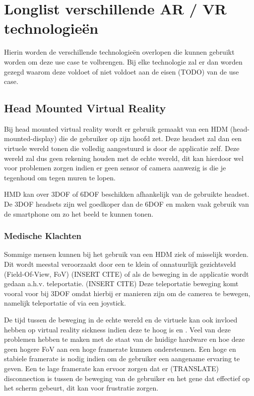 \chapter{Longlist verschillende AR / VR technologieën}
\label{ch:longlist}

Hierin worden de verschillende technologieën overlopen die kunnen gebruikt worden om deze use case te volbrengen.
Bij elke technologie zal er dan worden gezegd waarom deze voldoet of niet voldoet aan de eisen (TODO) van de use case.

\section{Head Mounted Virtual Reality}
Bij head mounted virtual reality wordt er gebruik gemaakt van een HDM (head-mounted-display) die de gebruiker op zijn hoofd zet. Deze headset zal dan een virtuele wereld tonen die volledig aangestuurd is door de applicatie zelf. Deze wereld zal dus geen rekening houden met de echte wereld, dit kan hierdoor wel voor problemen zorgen indien er geen sensor of camera aanwezig is die je tegenhoud om tegen muren te lopen.

HMD kan over 3DOF of 6DOF beschikken afhankelijk van de gebruikte headset. De 3DOF headsets zijn wel goedkoper dan de 6DOF en maken vaak gebruik van de smartphone om zo het beeld te kunnen tonen. 
\subsection{Medische Klachten}
Sommige mensen kunnen bij het gebruik van een HDM ziek of misselijk worden. Dit wordt meestal veroorzaakt door een te klein of onnatuurlijk gezichtsveld (Field-Of-View, FoV) (INSERT CITE) of als de beweging in de applicatie wordt gedaan a.h.v. teleportatie. (INSERT CITE) Deze teleportatie beweging komt vooral voor bij 3DOF omdat hierbij er manieren zijn om de camerea te bewegen, namelijk teleportatie of via een joystick.

De tijd tussen de beweging in de echte wereld en de virtuele kan ook invloed hebben op virtual reality sickness indien deze te hoog is \autocite{Elbamby2018} en \autocite{DiZio2000}. 
Veel van deze problemen hebben te maken met de staat van de huidige hardware en hoe deze geen hogere FoV aan een hoge framerate kunnen ondersteunen. Een hoge en stabiele framerate is nodig indien om de gebruiker een aangename ervaring te geven. Een te lage framerate kan ervoor zorgen dat er (TRANSLATE) disconnection is tussen de beweging van de gebruiker en het gene dat effectief op het scherm gebeurt, dit kan voor frustratie zorgen.
